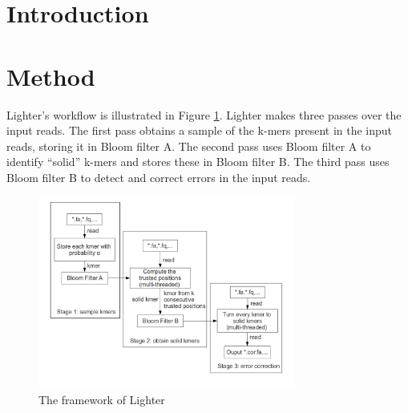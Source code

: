 \documentclass[10pt]{article}
\begin{document}

\section*{Introduction}
\section*{Method}
Lighter's workflow is illustrated in Figure \ref{fig:lighter_framework}. Lighter makes three passes over the input reads.  The first pass obtains a sample of the k-mers present in the input reads, storing it in Bloom filter A.  The second pass uses Bloom filter A to identify ``solid'' k-mers and stores these in Bloom filter B.  The third pass uses Bloom filter B to detect and correct errors in the input reads.

\begin{figure}[h!]
\begin{center}
\includegraphics[width=0.75\textwidth]{lighter_framework.png}
\caption{The framework of Lighter\label{fig:lighter_framework}}
\end{center}
\end{figure}
\end{document}
